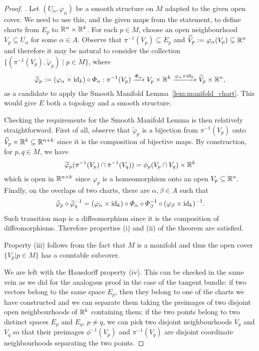 \begin{proof}
  .
Let $(U_\alpha, \varphi_\alpha)$ be a smooth structure on $M$ adapted to the given open cover.
We need to use this, and the given maps from the statement, to define charts from $E_p$ to $\mathbb{R}^n\times\mathbb{R}^k$.
For each $p\in M$, choose an open neighbourhood $V_p \subseteq U_\alpha$ for some $\alpha\in A$.
Observe that $\pi^{-1}(V_p) \subseteq E_p$ and $\widetilde{V}_p := \varphi_\alpha(V_p) \subseteq \mathbb{R}^n$ and therefore it may be natural to consider the collection $\{(\pi^{-1}(V_p), \widetilde{\varphi}_p)\mid p\in M\}$, where
\begin{equation}
  \widetilde{\varphi}_p := (\varphi_\alpha\times \operatorname{id}_k) \circ \varPhi_\alpha : \pi^{-1}(V_p) \xrightarrow{\varPhi_\alpha} V_p\times\mathbb{R}^k \xrightarrow{\varphi_\alpha\times \operatorname{id}_k} \widetilde{V}_p\times \mathbb{R}^n,
\end{equation}
as a candidate to apply the Smooth Manifold Lemma~\ref{lem:manifold_chart}.
This would give $E$ both a topology and a smooth structure.

Checking the requirements for the Smooth Manifold Lemma is then relatively straightforward.
First of all, observe that $\widetilde{\varphi}_p$ is a bijection from $\pi^{-1}(V_p)$ onto $\widetilde{V}_p\times\mathbb{R}^k \subseteq \mathbb{R}^{n+k}$ since it is the composition of bijective maps.
By construction, for $p,q\in M$, we have
\begin{equation}
  \widetilde{\varphi}_p(\pi^{-1}(V_p) \cap \pi^{-1}(V_q)) = \phi_p(V_p\cap V_q)\times \mathbb{R}^k
\end{equation}
which is open in $\mathbb{R}^{n+k}$ since $\varphi_p$ is a homeomorphism onto an open $V_p\subseteq\mathbb{R}^n$.
Finally, on the overlaps of two charts, there are $\alpha, \beta\in A$ such that
\begin{equation}
  \widetilde{\varphi}_p \circ \widetilde{\varphi}_q^{-1} =
  (\varphi_\alpha \times \operatorname{id}_k) \circ \varPhi_\alpha \circ \varPhi_\beta^{-1} \circ (\varphi_\beta \times \operatorname{id}_k)^{-1}.
\end{equation}
Such transition map is a diffeomorphism since it is the composition of diffeomorphisms.
Therefore properties (i) and (ii) of the theorem are satisfied.

Property (iii) follows from the fact that $M$ is a manifold and thus the open cover $\{V_p | p \in M\}$ has a countable subcover.

We are left with the Hausdorff property (iv).
This can be checked in the same vein as we did for the analogous proof in the case of the tangent bundle:
if two vectors belong to the same space $E_p$, then they belong to one of the charts we have constructed and we can separate them taking the preimages of two disjoint open neighbourhoods of $\mathbb{R}^k$ containing them; if the two points belong to two distinct spaces $E_p$ and $E_q$, $p\neq q$, we can pick two disjoint neighbourhoods $V_p$ and $V_q$ so that their preimages $\phi^{-1}(V_p)$ and $\pi^{-1}(V_q)$ are disjoint coordinate neighbourhoods separating the two points.


\end{proof}
